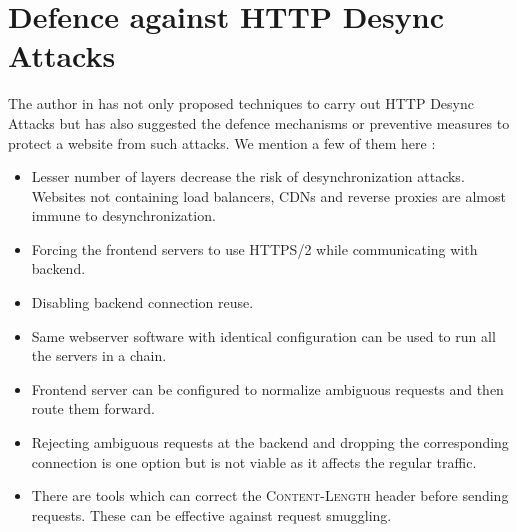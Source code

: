 \chapter{Defence against HTTP Desync Attacks}
The author in \cite{b6} has not only proposed techniques to carry out HTTP Desync Attacks but has also suggested the defence mechanisms or preventive measures to protect a website from such attacks. We mention a few of them here :
\begin{itemize}
	\item Lesser number of layers decrease the risk of desynchronization attacks. Websites not containing load balancers, CDNs and reverse proxies are almost immune to desynchronization. 
	\item Forcing the frontend servers to use HTTPS/2 \cite{b15} while communicating with backend. 
	\item Disabling backend connection reuse.
	\item Same webserver software with identical configuration can be used to run all the servers in a chain. 
	\item Frontend server can be configured to normalize ambiguous requests and then route them forward. 
	\item Rejecting ambiguous requests at the backend and dropping the corresponding connection is one option but is not viable as it affects the regular traffic. 
	\item There are tools which can correct the \textsc{Content-Length} header before sending requests. These can be effective against request smuggling. 
\end{itemize}